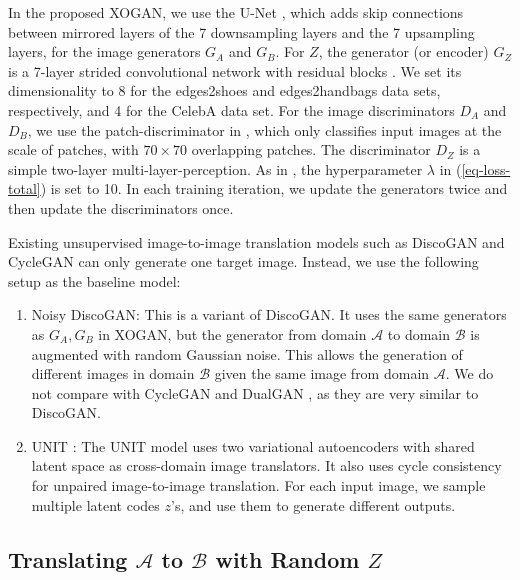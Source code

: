 \documentclass[conference]{IEEEtran}
\theoremstyle{definition}
\begin{document}
In the proposed XOGAN, we use the U-Net \cite{ronneberger2015u}, which adds skip connections between mirrored layers of the 7 downsampling layers
and the 7 upsampling layers, for the image generators $G_A$ and $G_B$. For $Z$, the generator (or encoder) $G_Z$ is a 7-layer strided
convolutional network with residual blocks \cite{he2016deep}. We set its dimensionality to 8 for the {\sf edges2shoes} and {\sf edges2handbags} data sets,
respectively, and 4 for the {\sf CelebA} data set. For the image discriminators $D_A$ and $D_B$, we use the patch-discriminator in \cite{li2016precomputed}, which only classifies input images at the scale of patches, with $70\times70$ overlapping patches. The discriminator $D_Z$ is a simple two-layer multi-layer-perception. As in \cite{zhu2017unpaired}, the hyperparameter $\lambda$ in (\ref{eq-loss-total}) is set to 10. In each training iteration, we update the generators twice and then update the discriminators once.

Existing  unsupervised image-to-image translation models such as DiscoGAN \cite{kim2017learning} and CycleGAN \cite{zhu2017unpaired} can only generate one target image. Instead, we use the following setup as the baseline model:
\begin{enumerate}
	\item Noisy DiscoGAN: This is a variant of DiscoGAN. It uses the same generators as $G_A, G_B$ in XOGAN, but the generator from domain $\mathcal A$ to domain $\mathcal B$ is augmented with random Gaussian noise. This allows the generation of different images in domain $\mathcal B$ given the same image from domain $\mathcal A$. We do not compare with CycleGAN \cite{zhu2017unpaired} and DualGAN \cite{yi2017dualgan}, as they are very similar to DiscoGAN.
	\item UNIT \cite{liu2017unsupervised}: The UNIT model uses two variational autoencoders \cite{kingma2013auto} with shared latent space as
	cross-domain image translators.  It also uses cycle consistency for unpaired image-to-image translation. For each input image, we sample multiple latent codes $z$'s, and use them to generate different outputs.
\end{enumerate}

\subsection{Translating $\mathcal A$ to $\mathcal B$ with Random $Z$}
\label{sec-AB}
\end{document}
